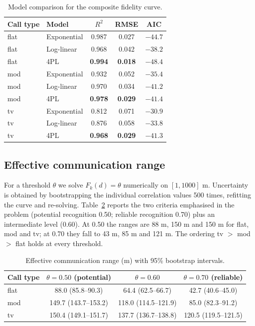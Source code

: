 \documentclass{apmcmthesis}
\begin{document}
\begin{table}[htbp]
\centering
\caption{Model comparison for the composite fidelity curve.}
\label{tab:q2models}
\small
\begin{tabular}{llccc}
\toprule
Call type & Model & $R^2$ & RMSE & AIC \\
\midrule
flat & Exponential & 0.987 & 0.027 & $-44.7$ \\
flat & Log-linear & 0.968 & 0.042 & $-38.2$ \\
flat & 4PL & \textbf{0.994} & \textbf{0.018} & $\mathbf{-48.4}$ \\
mod & Exponential & 0.932 & 0.052 & $-35.4$ \\
mod & Log-linear & 0.970 & 0.034 & $-41.2$ \\
mod & 4PL & \textbf{0.978} & \textbf{0.029} & $\mathbf{-41.4}$ \\
tv & Exponential & 0.812 & 0.071 & $-30.9$ \\
tv & Log-linear & 0.876 & 0.058 & $-33.8$ \\
tv & 4PL & \textbf{0.968} & \textbf{0.029} & $\mathbf{-41.3}$ \\
\bottomrule
\end{tabular}
\end{table}

\subsection{Effective communication range}
For a threshold $\theta$ we solve $F_k(d)=\theta$ numerically on $[1,1000]$ m. Uncertainty is
obtained by bootstrapping the individual correlation values 500 times, refitting the curve and
re-solving. Table~\ref{tab:q2range} reports the two criteria emphasised in the problem
(potential recognition 0.50; reliable recognition 0.70) plus an intermediate level (0.60).
At 0.50 the ranges are 88 m, 150 m and 150 m for flat, mod and tv; at 0.70 they fall to 43 m,
85 m and 121 m. The ordering tv $>$ mod $>$ flat holds at every threshold.

\begin{table}[htbp]
\centering
\caption{Effective communication range (m) with 95\% bootstrap intervals.}
\label{tab:q2range}
\small
\begin{tabular}{lccc}
\toprule
Call type & $\theta=0.50$ (potential) & $\theta=0.60$ & $\theta=0.70$ (reliable) \\
\midrule
flat & 88.0 (85.8--90.3) & 64.4 (62.5--66.7) & 42.7 (40.6--45.0) \\
mod & 149.7 (143.7--153.2) & 118.0 (114.5--121.9) & 85.0 (82.3--91.2) \\
tv & 150.4 (149.1--151.7) & 137.7 (136.7--138.8) & 120.5 (119.5--121.5) \\
\bottomrule
\end{tabular}
\end{table}
\end{document}
